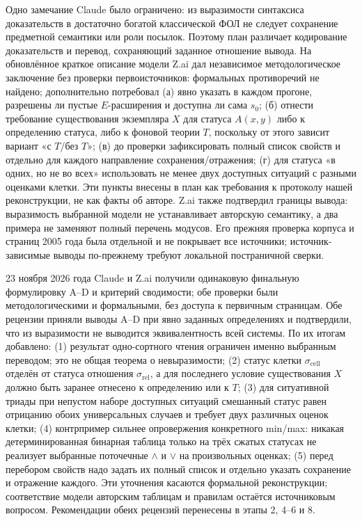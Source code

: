 \documentclass[12pt,a4paper]{article}
\begin{document}
Одно замечание Claude было ограничено: из выразимости синтаксиса доказательств в достаточно богатой классической ФОЛ не следует сохранение предметной семантики или роли посылок. Поэтому план различает кодирование доказательств и перевод, сохраняющий заданное отношение вывода. На обновлённое краткое описание модели Z.ai дал независимое методологическое заключение без проверки первоисточников: формальных противоречий не найдено; дополнительно потребовал (а) явно указать в каждом прогоне, разрешены ли пустые \(E\)-расширения и доступна ли сама \(s_0\); (б) отнести требование существования экземпляра \(X\) для статуса \(A(x,y)\) либо к определению статуса, либо к фоновой теории \(T\), поскольку от этого зависит вариант «с \(T\)/без \(T\)»; (в) до проверки зафиксировать полный список свойств и отдельно для каждого направление сохранения/отражения; (г) для статуса «в одних, но не во всех» использовать не менее двух доступных ситуаций с разными оценками клетки. Эти пункты внесены в план как требования к протоколу нашей реконструкции, не как факты об авторе. Z.ai также подтвердил границы вывода: выразимость выбранной модели не устанавливает авторскую семантику, а два примера не заменяют полный перечень модусов. Его прежняя проверка корпуса и страниц 2005 года была отдельной и не покрывает все источники; источник-зависимые выводы по-прежнему требуют локальной постраничной сверки.

23 ноября 2026 года Claude и Z.ai получили одинаковую финальную формулировку A–D и критерий сводимости; обе проверки были методологическими и формальными, без доступа к первичным страницам. Обе рецензии приняли выводы A–D при явно заданных определениях и подтвердили, что из выразимости не выводится эквивалентность всей системы. По их итогам добавлено: (1) результат одно-сортного чтения ограничен именно выбранным переводом; это не общая теорема о невыразимости; (2) статус клетки \(\sigma_{\mathrm{cell}}\) отделён от статуса отношения \(\sigma_{\mathrm{rel}}\), а для последнего условие существования \(X\) должно быть заранее отнесено к определению или к \(T\); (3) для ситуативной триады при непустом наборе доступных ситуаций смешанный статус равен отрицанию обоих универсальных случаев и требует двух различных оценок клетки; (4) контрпример сильнее опровержения конкретного min/max: никакая детерминированная бинарная таблица только на трёх сжатых статусах не реализует выбранные поточечные \(\land\) и \(\lor\) на произвольных оценках; (5) перед перебором свойств надо задать их полный список и отдельно указать сохранение и отражение каждого. Эти уточнения касаются формальной реконструкции; соответствие модели авторским таблицам и правилам остаётся источниковым вопросом. Рекомендации обеих рецензий перенесены в этапы 2, 4–6 и 8.
\end{document}

